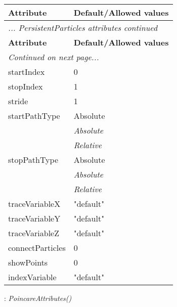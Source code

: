 \documentclass[10pt,a4paper]{report}
\begin{document}
\begin{longtable}{ll}
{\bf Attribute} & {\bf Default/Allowed values} \\
\hline \hline
\endfirsthead
\multicolumn{2}{l}{{\it ... PersistentParticles attributes continued}} \\
{\bf Attribute} & {\bf Default/Allowed values} \\
\hline \hline
\endhead
\hline
\multicolumn{2}{l}{{\it Continued on next page...}} \\
\endfoot
\hline
\endlastfoot

startIndex  &  0 \\
stopIndex  &  1 \\
stride  &  1 \\
startPathType  &  Absolute   \\
 & {\it  Absolute} \\
 & {\it  Relative} \\
stopPathType  &  Absolute   \\
 & {\it  Absolute} \\
 & {\it  Relative} \\
traceVariableX  &  "default" \\
traceVariableY  &  "default" \\
traceVariableZ  &  "default" \\
connectParticles  &  0 \\
showPoints  &  0 \\
indexVariable  &  "default" \\
\end{longtable}

\newpage

{}
: {\it PoincareAttributes() }\\[-3mm]
\end{document}
